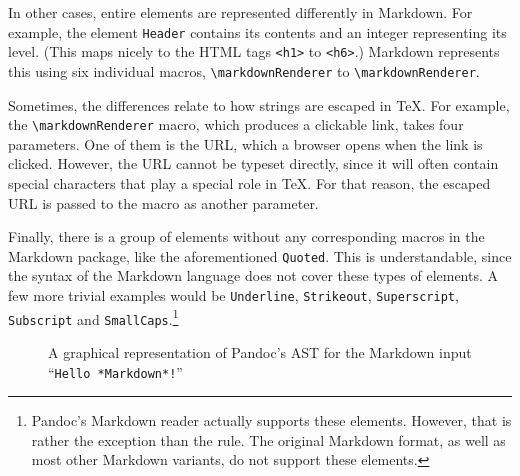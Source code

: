 \documentclass[
  digital,     %
  oneside,     %
  nosansbold,  %
  nocolorbold, %
  lof,         %
  nolot,       %
]{fithesis4}
\newcommand\macro[1]{\texttt{\textbackslash{}{#1}}}
\newcommand\renderer[1]{\macro{markdown\-Renderer\-{#1}}}
\begin{document}
In other cases, entire elements are represented differently in Markdown. For example, the element \texttt{Header} contains its contents and an integer representing its level. (This maps nicely to the HTML tags \texttt{<h1>} to \texttt{<h6>}.) Markdown represents this using six individual macros, \renderer{HeadingOne} to \renderer{HeadingSix}.

Sometimes, the differences relate to how strings are escaped in \TeX{}. For example, the \renderer{Link} macro, which produces a clickable link, takes four parameters. One of them is the URL, which a browser opens when the link is clicked. However, the URL cannot be typeset directly, since it will often contain special characters that play a special role in \TeX{}. For that reason, the escaped URL is passed to the macro as another parameter.

Finally, there is a group of elements without any corresponding macros in the Markdown package, like the aforementioned \texttt{Quoted}. This is understandable, since the syntax of the Markdown language does not cover these types of elements. A few more trivial examples would be \texttt{Underline}, \texttt{Strikeout}, \texttt{Superscript}, \texttt{Subscript} and \texttt{SmallCaps}.\footnote{Pandoc's Markdown reader actually supports these elements. However, that is rather the exception than the rule. The original Markdown format, as well as most other Markdown variants, do not support these elements.}

\begin{figure}
  \centering
  \caption{A graphical representation of Pandoc's AST for the Markdown input ``\texttt{Hello *Markdown*!}''}
  \label{fig:pandoc-ast}
\end{figure}
\end{document}
